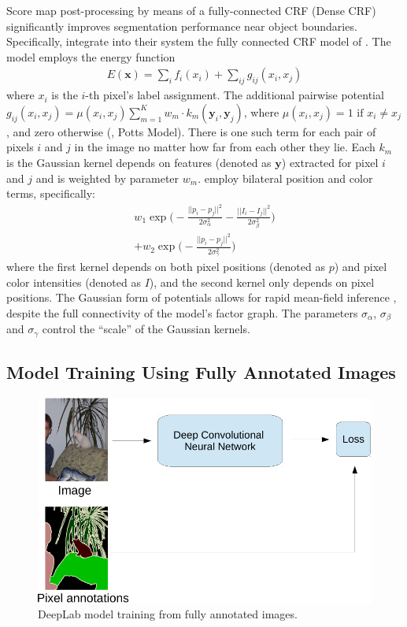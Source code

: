 Score map post-processing by means of a fully-connected CRF (Dense CRF)
\cite{krahenbuhl2011efficient} significantly improves segmentation
performance near object boundaries. Specifically,
\citet{chen2014semantic} integrate into their system the fully
connected CRF model of \citet{krahenbuhl2011efficient}.
The model employs the energy function
\begin{align}
  E(\boldsymbol{x}) = \sum_i f_i(x_i) + \sum_{ij} g_{ij}(x_i, x_j)
\end{align}
where $x_i$ is the $i$-th pixel's label assignment. The
additional pairwise potential $g_{ij}(x_i, x_j) =
\mu(x_i,x_j)\sum_{m=1}^{K} w_m \cdot k_m(\boldsymbol{y}_i,
\boldsymbol{y}_j)$, where $\mu(x_i,x_j)=1 \text{ if } x_i \neq x_j$,
and zero otherwise (\ie, Potts Model). There is one such term for
each pair of pixels $i$ and $j$ in the image no matter how far from
each other they lie. Each $k_m$ is the Gaussian kernel depends on features
(denoted as $\boldsymbol{y}$) extracted for pixel $i$ and $j$ and is
weighted by parameter $w_m$. \citet{chen2014semantic} employ bilateral
position and color terms, specifically:
\begin{multline}
  \label{eq:fully_crf}
  w_1 \exp \Big(-\frac{||p_i-p_j||^2}{2\sigma_\alpha^2}
  -\frac{||I_i-I_j||^2}{2\sigma_\beta^2} \Big)\\
  + w_2 \exp \Big(-\frac{||p_i-p_j||^2}{2\sigma_\gamma^2}\Big)
\end{multline}
where the first kernel depends on both pixel positions (denoted as $p$) and
pixel color intensities (denoted as $I$), and the second kernel only depends
on pixel positions. The Gaussian form of potentials allows for rapid
mean-field inference \citep{krahenbuhl2011efficient}, despite the full
connectivity of the model's factor graph. The parameters
$\sigma_\alpha$, $\sigma_\beta$ and $\sigma_\gamma$ control the
``scale'' of the Gaussian kernels.

\subsection{Model Training Using Fully Annotated Images}
\label{sec:train_pixel}

\begin{figure}[tbp!]
  \centering
  \includegraphics[width=0.7\linewidth]{fig/model_train_pixel.pdf} 
  \caption{DeepLab model training from fully annotated images.}
  \label{fig:model_train_pixel}
\end{figure}

